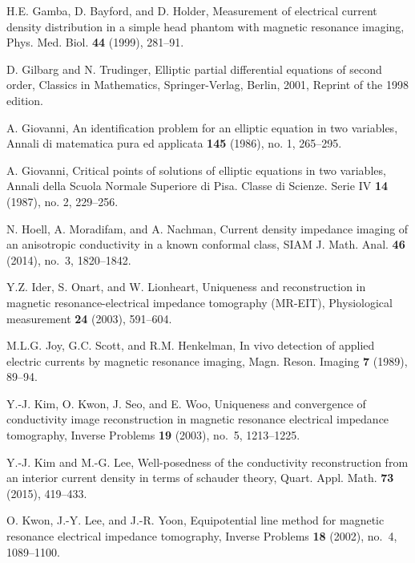 \documentclass[11pt]{amsart}
\theoremstyle{plain}
\theoremstyle{remark}
\numberwithin{equation}{section}
\numberwithin{Thm}{section}
\begin{document}
\begin{thebibliography}{10}
  
H.E. Gamba, D. Bayford, and D. Holder, {Measurement of electrical current
  density distribution in a simple head phantom with magnetic resonance
  imaging}, Phys. Med. Biol. \textbf{44} (1999), 281--91.

  
D. Gilbarg and N. Trudinger, {Elliptic partial differential
  equations of second order}, Classics in Mathematics, Springer-Verlag, Berlin,
  2001, Reprint of the 1998 edition.

        
        
        {A. Giovanni}, 
        {An identification problem for an elliptic equation in two variables}, 
        Annali di matematica pura ed applicata \textbf{145} (1986), no. 1, 265--295.

        {A. Giovanni}, 
        {Critical points of solutions of elliptic equations in two  variables}, 
        Annali della Scuola Normale Superiore di Pisa. Classe di Scienze. Serie {IV} \textbf{14} (1987), no. 2, 229--256.
  
  
  
N. Hoell, A. Moradifam, and A. Nachman, {Current density
  impedance imaging of an anisotropic conductivity in a known conformal class},
  SIAM J. Math. Anal. \textbf{46} (2014), no.~3, 1820--1842. %

Y.Z. Ider, S. Onart, and W. Lionheart, {Uniqueness and reconstruction in
  magnetic resonance-electrical impedance tomography ({MR}-{EIT})},
  Physiological measurement \textbf{24} (2003), 591--604.

M.L.G. Joy, G.C. Scott, and R.M. Henkelman, {In vivo detection of applied
  electric currents by magnetic resonance imaging}, Magn. Reson. Imaging
  \textbf{7} (1989), 89--94.

Y.-J. Kim, O. Kwon, J. Seo, and E. Woo, {Uniqueness and
  convergence of conductivity image reconstruction in magnetic resonance
  electrical impedance tomography}, Inverse Problems \textbf{19} (2003), no.~5,
  1213--1225.

Y.-J. Kim and M.-G. Lee, {Well-posedness of the conductivity
  reconstruction from an interior current density in terms of schauder theory},
  Quart. Appl. Math. \textbf{73} (2015), 419--433.

O. Kwon, J.-Y. Lee, and J.-R. Yoon, {Equipotential line method
  for magnetic resonance electrical impedance tomography}, Inverse Problems
  \textbf{18} (2002), no.~4, 1089--1100.


\end{thebibliography}
\end{document}
